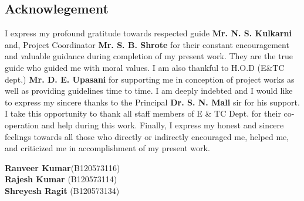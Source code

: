 \documentclass[12pt,a4paper,oneside,openright]{report}
\begin{document}
\newpage
{} %

\tableofcontents

\begin{center}
\chapter*{Acknowlegement}	%
\end{center}
\doublespacing

I express my profound gratitude towards respected guide \textbf{Mr. N. S. Kulkarni} and, Project Coordinator \textbf{Mr. S. B. Shrote} for their constant encouragement and valuable guidance during completion of my present work. They are the true guide who guided me with moral values.
	I am also thankful to H.O.D (E\&TC dept.) \textbf{Mr. D. E. Upasani} for supporting me in conception of project works as well as providing guidelines time to time.
	I am deeply indebted and I would like to express my sincere thanks to the Principal \textbf{Dr. S. N. Mali} sir for his support.
I take this opportunity to thank all staff members of E \& TC Dept. for their co-operation and help during this work.
Finally, I express my honest and sincere feelings towards all those who directly or indirectly encouraged me, helped me, and criticized me in accomplishment of my present work.

\vspace{2cm}

\begin{flushright}
\textbf{Ranveer Kumar}(B120573116)\\
\textbf{Rajesh Kumar}   (B120573114)\\
\textbf{Shreyesh Ragit} (B120573134)
\end{flushright}
\hfill
\pagebreak

\listoffigures
\newpage
{}
\listoftables
\newpage
{}
\end{document}
